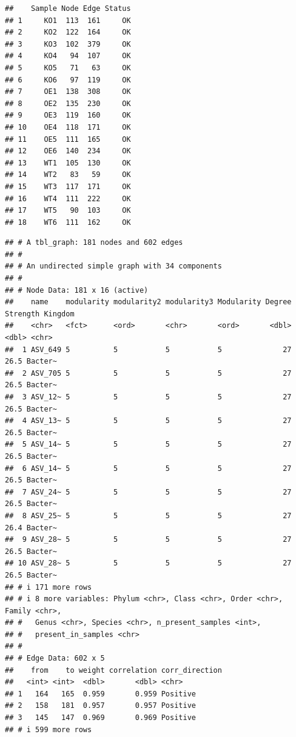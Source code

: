 \documentclass[
]{book}
\newenvironment{Shaded}{\begin{snugshade}}{\end{snugshade}}
\newcommand{\CommentTok}[1]{\textcolor[rgb]{0.56,0.35,0.01}{\textit{#1}}}
\newcommand{\NormalTok}[1]{#1}
\newcommand{\SpecialCharTok}[1]{\textcolor[rgb]{0.81,0.36,0.00}{\textbf{#1}}}
\begin{document}
\begin{verbatim}
##    Sample Node Edge Status
## 1     KO1  113  161     OK
## 2     KO2  122  164     OK
## 3     KO3  102  379     OK
## 4     KO4   94  107     OK
## 5     KO5   71   63     OK
## 6     KO6   97  119     OK
## 7     OE1  138  308     OK
## 8     OE2  135  230     OK
## 9     OE3  119  160     OK
## 10    OE4  118  171     OK
## 11    OE5  111  165     OK
## 12    OE6  140  234     OK
## 13    WT1  105  130     OK
## 14    WT2   83   59     OK
## 15    WT3  117  171     OK
## 16    WT4  111  222     OK
## 17    WT5   90  103     OK
## 18    WT6  111  162     OK
\end{verbatim}

\begin{Shaded}
\end{Shaded}

\begin{verbatim}
## # A tbl_graph: 181 nodes and 602 edges
## #
## # An undirected simple graph with 34 components
## #
## # Node Data: 181 x 16 (active)
##    name    modularity modularity2 modularity3 Modularity Degree Strength Kingdom
##    <chr>   <fct>      <ord>       <chr>       <ord>       <dbl>    <dbl> <chr>  
##  1 ASV_649 5          5           5           5              27     26.5 Bacter~
##  2 ASV_705 5          5           5           5              27     26.5 Bacter~
##  3 ASV_12~ 5          5           5           5              27     26.5 Bacter~
##  4 ASV_13~ 5          5           5           5              27     26.5 Bacter~
##  5 ASV_14~ 5          5           5           5              27     26.5 Bacter~
##  6 ASV_14~ 5          5           5           5              27     26.5 Bacter~
##  7 ASV_24~ 5          5           5           5              27     26.5 Bacter~
##  8 ASV_25~ 5          5           5           5              27     26.4 Bacter~
##  9 ASV_28~ 5          5           5           5              27     26.5 Bacter~
## 10 ASV_28~ 5          5           5           5              27     26.5 Bacter~
## # i 171 more rows
## # i 8 more variables: Phylum <chr>, Class <chr>, Order <chr>, Family <chr>,
## #   Genus <chr>, Species <chr>, n_present_samples <int>,
## #   present_in_samples <chr>
## #
## # Edge Data: 602 x 5
##    from    to weight correlation corr_direction
##   <int> <int>  <dbl>       <dbl> <chr>         
## 1   164   165  0.959       0.959 Positive      
## 2   158   181  0.957       0.957 Positive      
## 3   145   147  0.969       0.969 Positive      
## # i 599 more rows
\end{verbatim}
\end{document}
